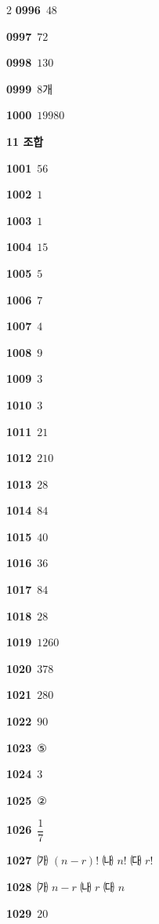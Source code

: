 \documentclass[10pt,a4paper]{article}
\begin{document}
\begin{multicols}{2}
\noindent\textbf{0996}\ $48$\par
\noindent\textbf{0997}\ $72$\par
\noindent\textbf{0998}\ $130$\par
\noindent\textbf{0999}\ $8$개\par
\noindent\textbf{1000}\ $19980$\par
\noindent\textbf{11 조합}\par\smallskip
\noindent\textbf{1001}\ $56$\par
\noindent\textbf{1002}\ $1$\par
\noindent\textbf{1003}\ $1$\par
\noindent\textbf{1004}\ $15$\par
\noindent\textbf{1005}\ $5$\par
\noindent\textbf{1006}\ $7$\par
\noindent\textbf{1007}\ $4$\par
\noindent\textbf{1008}\ $9$\par
\noindent\textbf{1009}\ $3$\par
\noindent\textbf{1010}\ $3$\par
\noindent\textbf{1011}\ $21$\par
\noindent\textbf{1012}\ $210$\par
\noindent\textbf{1013}\ $28$\par
\noindent\textbf{1014}\ $84$\par
\noindent\textbf{1015}\ $40$\par
\noindent\textbf{1016}\ $36$\par
\noindent\textbf{1017}\ $84$\par
\noindent\textbf{1018}\ $28$\par
\noindent\textbf{1019}\ $1260$\par
\noindent\textbf{1020}\ $378$\par
\noindent\textbf{1021}\ $280$\par
\noindent\textbf{1022}\ $90$\par
\noindent\textbf{1023}\ ⑤\par
\noindent\textbf{1024}\ $3$\par
\noindent\textbf{1025}\ ②\par
\noindent\textbf{1026}\ $\dfrac{1}{7}$\par
\noindent\textbf{1027}\ ㈎ $(n-r)!$ \quad ㈏ $n!$ \quad ㈐ $r!$\par
\noindent\textbf{1028}\ ㈎ $n-r$ \quad ㈏ $r$ \quad ㈐ $n$\par
\noindent\textbf{1029}\ $20$\par

\end{multicols}
\end{document}
